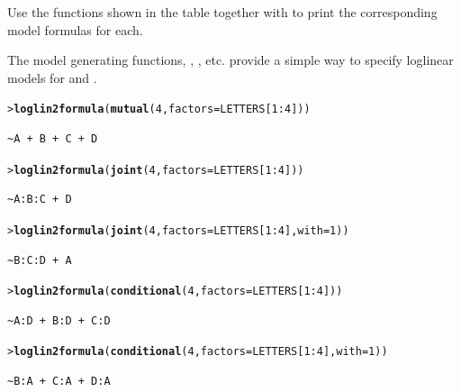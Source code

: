 \documentclass[10pt]{report}\usepackage[]{graphicx}\usepackage[]{color}
\makeatletter
\newcommand{\hlnum}[1]{\textcolor[rgb]{0.686,0.059,0.569}{#1}}%
\newcommand{\hlopt}[1]{\textcolor[rgb]{0,0,0}{#1}}%
\newcommand{\hlstd}[1]{\textcolor[rgb]{0.345,0.345,0.345}{#1}}%
\newcommand{\hlkwc}[1]{\textcolor[rgb]{0.333,0.667,0.333}{#1}}%
\newcommand{\hlkwd}[1]{\textcolor[rgb]{0.737,0.353,0.396}{\textbf{#1}}}%
\newenvironment{kframe}{%
 \def\at@end@of@kframe{}%
 \ifinner\ifhmode%
  \def\at@end@of@kframe{\end{minipage}}%
  \begin{minipage}{\columnwidth}%
 \fi\fi%
 \def\FrameCommand##1{\hskip\@totalleftmargin \hskip-\fboxsep
 \colorbox{shadecolor}{##1}\hskip-\fboxsep
     \hskip-\linewidth \hskip-\@totalleftmargin \hskip\columnwidth}%
 \MakeFramed {\advance\hsize-\width
   \@totalleftmargin\z@ \linewidth\hsize
   \@setminipage}}%
 {\par\unskip\endMakeFramed%
 \at@end@of@kframe}
\newenvironment{knitrout}{}{} %
\renewenvironment{knitrout}{\small\renewcommand{\baselinestretch}{.85}}{} %
\makeatother
\begin{document}
\begin{Exercises}
\begin{enumerate*}
    \item Use the functions shown in the table together with  to print the
    corresponding model formulas for each.
    \begin{ans}
    The model generating functions, , , etc. provide a simple way to
    specify loglinear models for  and .  
\begin{knitrout}\footnotesize
{}\color{fgcolor}\begin{kframe}
\begin{alltt}
\hlstd{> }\hlkwd{loglin2formula}\hlstd{(}\hlkwd{mutual}\hlstd{(}\hlnum{4}\hlstd{,} \hlkwc{factors}\hlstd{=LETTERS[}\hlnum{1}\hlopt{:}\hlnum{4}\hlstd{]))}
\end{alltt}
\begin{verbatim}
~A + B + C + D
\end{verbatim}
\begin{alltt}
\hlstd{> }\hlkwd{loglin2formula}\hlstd{(}\hlkwd{joint}\hlstd{(}\hlnum{4}\hlstd{,} \hlkwc{factors}\hlstd{=LETTERS[}\hlnum{1}\hlopt{:}\hlnum{4}\hlstd{]))}
\end{alltt}
\begin{verbatim}
~A:B:C + D
\end{verbatim}
\begin{alltt}
\hlstd{> }\hlkwd{loglin2formula}\hlstd{(}\hlkwd{joint}\hlstd{(}\hlnum{4}\hlstd{,} \hlkwc{factors}\hlstd{=LETTERS[}\hlnum{1}\hlopt{:}\hlnum{4}\hlstd{],} \hlkwc{with}\hlstd{=}\hlnum{1}\hlstd{))}
\end{alltt}
\begin{verbatim}
~B:C:D + A
\end{verbatim}
\begin{alltt}
\hlstd{> }\hlkwd{loglin2formula}\hlstd{(}\hlkwd{conditional}\hlstd{(}\hlnum{4}\hlstd{,} \hlkwc{factors}\hlstd{=LETTERS[}\hlnum{1}\hlopt{:}\hlnum{4}\hlstd{]))}
\end{alltt}
\begin{verbatim}
~A:D + B:D + C:D
\end{verbatim}
\begin{alltt}
\hlstd{> }\hlkwd{loglin2formula}\hlstd{(}\hlkwd{conditional}\hlstd{(}\hlnum{4}\hlstd{,} \hlkwc{factors}\hlstd{=LETTERS[}\hlnum{1}\hlopt{:}\hlnum{4}\hlstd{],} \hlkwc{with}\hlstd{=}\hlnum{1}\hlstd{))}
\end{alltt}
\begin{verbatim}
~B:A + C:A + D:A
\end{verbatim}

\end{kframe}
\end{knitrout}
\end{ans}
\end{enumerate*}
\end{Exercises}
\end{document}
